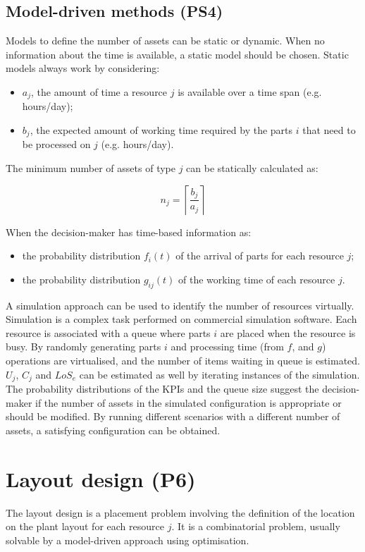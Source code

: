 \subsection{Model-driven methods (PS4)}
Models to define the number of assets can be static or dynamic. When no information about the time is available, a static model should be chosen. Static models always work by considering:
\begin{itemize}
    \item $a_j$, the amount of time a resource $j$ is available over a time span (e.g. hours/day);
	\item $b_j$, the expected amount of working time required by the parts $i$ that need to be processed on $j$ (e.g. hours/day).

\end{itemize}

The minimum number of assets of type $j$ can be statically calculated as:

\begin{equation}
    n_j=\left\lceil\frac{b_j}{a_j}\right\rceil
\end{equation}

When the decision-maker has time-based information as:
\begin{itemize}
    \item the probability distribution $f_i(t)$ of the arrival of parts for each resource $j$;
	\item the probability distribution $g_{ij}(t)$ of the working time of each resource $j$.

\end{itemize}

A simulation approach can be used to identify the number of resources virtually. Simulation is a complex task performed on commercial simulation software. Each resource is associated with a queue where parts $i$ are placed when the resource is busy. By randomly generating parts $i$ and processing time (from $f$, and $g$) operations are virtualised, and the number of items waiting in queue is estimated. $U_j$, $C_j$ and $LoS_e$ can be estimated as well by iterating instances of the simulation. The probability distributions of the KPIs and the queue size suggest the decision-maker if the number of assets in the simulated configuration is appropriate or should be modified. By running different scenarios with a different number of assets, a satisfying configuration can be obtained. 

\section{Layout design (P6)} \label{secProdLayoutDesign}
The layout design is a placement problem involving the definition of the location on the plant layout for each resource $j$. It is a combinatorial problem, usually solvable by a model-driven approach using optimisation.

